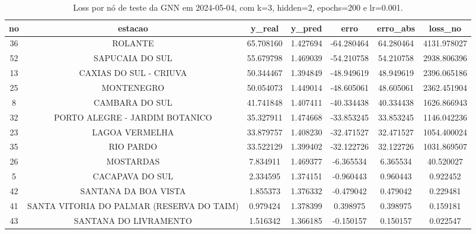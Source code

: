 \begin{table}[h]
\centering
\caption{Loss por nó de teste da GNN em 2024-05-04, com k=3, hidden=2, epochs=200 e lr=0.001.}
\label{tab:gnn_loss_nodes_k3_hidden2}
\begin{tabular}{ccccccc}
\toprule
no & estacao & y\_real & y\_pred & erro & erro\_abs & loss\_no \\
\midrule
36 & ROLANTE & 65.708160 & 1.427694 & -64.280464 & 64.280464 & 4131.978027 \\
52 & SAPUCAIA DO SUL & 55.679798 & 1.469039 & -54.210758 & 54.210758 & 2938.806396 \\
13 & CAXIAS DO SUL - CRIUVA & 50.344467 & 1.394849 & -48.949619 & 48.949619 & 2396.065186 \\
25 & MONTENEGRO & 50.054073 & 1.449014 & -48.605061 & 48.605061 & 2362.451904 \\
8 & CAMBARA DO SUL & 41.741848 & 1.407411 & -40.334438 & 40.334438 & 1626.866943 \\
32 & PORTO ALEGRE - JARDIM BOTANICO & 35.327911 & 1.474668 & -33.853245 & 33.853245 & 1146.042236 \\
23 & LAGOA VERMELHA & 33.879757 & 1.408230 & -32.471527 & 32.471527 & 1054.400024 \\
35 & RIO PARDO & 33.522129 & 1.399402 & -32.122726 & 32.122726 & 1031.869507 \\
26 & MOSTARDAS & 7.834911 & 1.469377 & -6.365534 & 6.365534 & 40.520027 \\
5 & CACAPAVA DO SUL & 2.334595 & 1.374151 & -0.960443 & 0.960443 & 0.922452 \\
42 & SANTANA DA BOA VISTA & 1.855373 & 1.376332 & -0.479042 & 0.479042 & 0.229481 \\
41 & SANTA VITORIA DO PALMAR (RESERVA DO TAIM) & 0.979424 & 1.378399 & 0.398975 & 0.398975 & 0.159181 \\
43 & SANTANA DO LIVRAMENTO & 1.516342 & 1.366185 & -0.150157 & 0.150157 & 0.022547 \\
\bottomrule
\end{tabular}
\end{table}
